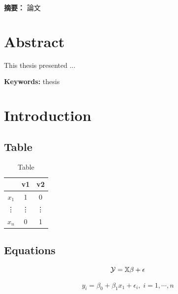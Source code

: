 \documentclass[12pt,a4paper,oneside]{book}
\providecommand{\keywordsch}[1]
{
  \small  
  \textbf{摘要： }#1
}
\providecommand{\keywords}[1]
{
  \small  
  \textbf{Keywords: }#1
}
\begin{document}
\mbox{}
\vfill
\keywordsch{論文}%

\thispagestyle{empty}

\chapter*{\centering Abstract}

This thesis presented ...

\mbox{}
\vfill
\keywords{thesis}%

\thispagestyle{empty}

\newpage
\setcounter{page}{1}
{
  \hypersetup{linkcolor=black}
  \tableofcontents
}

\newpage

\chapter{Introduction}
\label{ch: intro}
\section{Table}

\begin{table}[H]
\centering
\fontsize{20}{20}\selectfont%
\caption{Table}
\renewcommand{\arraystretch}{1.5}
\label{tab: tab1}
\begin{tabular}[t]{|c|c|c|}%
    \hline
    & v1 & v2 \\
    \hline
    $x_1$ & 1 & 0\\
    \hline
    \vdots & \vdots & \vdots\\
    \hline
    $x_n$ & 0 & 1\\
    \hline
\end{tabular}
\end{table}

\section{Equations}
\begin{equation}\label{equ: reg}
    \Large{\mathcal{Y} = \mathbb{X}\beta+\epsilon}
\end{equation}

\begin{equation*}\label{equ: reg}
    y_i =\beta_0+\beta_1x_1+\epsilon_i,\;i=1,\cdots,n
\end{equation*}
\end{document}
